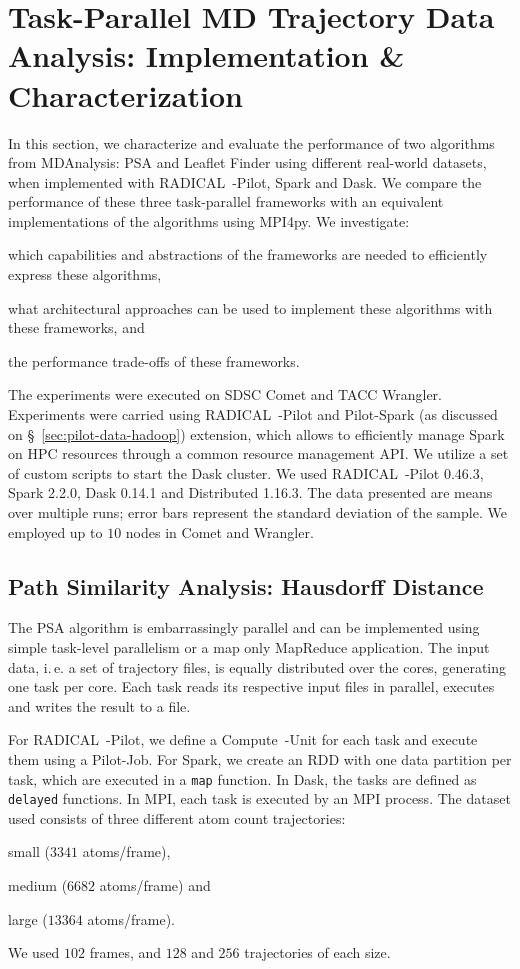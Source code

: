 \section{Task-Parallel MD Trajectory Data Analysis: Implementation \& Characterization}
\label{sec:impl_exp}
In this section, we characterize and evaluate the performance of two algorithms from MDAnalysis: PSA and Leaflet Finder using different real-world datasets, when implemented with RADICAL~-Pilot, Spark and Dask.
We compare the performance of these three task-parallel frameworks with an equivalent implementations of the algorithms using MPI4py.
We investigate: 
\begin{inparaenum}[1)]
    \item which capabilities and abstractions of the frameworks are needed to efficiently express these algorithms,
    \item what architectural approaches can be used to implement these algorithms with these frameworks, and
    \item the performance trade-offs of these frameworks.
\end{inparaenum}

The experiments were executed on SDSC Comet and TACC Wrangler.
Experiments were carried using RADICAL~-Pilot and Pilot-Spark (as discussed on \S~\ref{sec:pilot-data-hadoop}) extension, which allows to efficiently manage Spark on HPC resources through a common resource management API.
We utilize a set of custom scripts to start the Dask cluster.
We used RADICAL~-Pilot 0.46.3, Spark 2.2.0, Dask 0.14.1 and Distributed 1.16.3.
The data presented are means over multiple runs; error bars represent the standard deviation of the sample.
We employed up to $10$ nodes in Comet and Wrangler. 

\subsection{Path Similarity Analysis: Hausdorff Distance}
\label{sec:psa}
The PSA algorithm is embarrassingly parallel and can be implemented using simple task-level parallelism or a map only MapReduce application.
The input data, i.\,e. a set of trajectory files, is equally distributed over the cores, generating one task per core.
Each task reads its respective input files in parallel, executes and writes the result to a file.

For RADICAL~-Pilot, we define a Compute~-Unit for each task and execute them using a Pilot-Job. 
For Spark, we create an RDD with one data partition per task, which are executed in a \texttt{map} function.
In Dask, the tasks are defined as \texttt{delayed} functions.
In MPI, each task is executed by an MPI process.
The dataset used consists of three different atom count trajectories: 
\begin{inparaenum}[1)]
    \item small ($3341$ atoms/frame), 
    \item medium ($6682$ atoms/frame) and 
    \item large ($13364$ atoms/frame).
\end{inparaenum}
We used $102$ frames, and $128$ and $256$ trajectories of each size.

